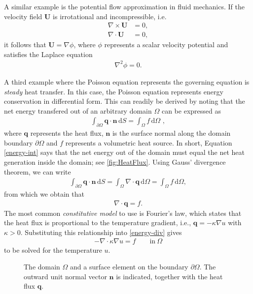 A similar example is the potential flow approximation in fluid mechanics. If the
velocity field $\bm U$ is irrotational and incompressible, i.e.
\begin{align}
  \nabla \times {\bm U} &= 0, \\
  \nabla \cdot  {\bm U} &= 0,
\end{align}
it follows that ${\bm U}= \nabla \phi$, where $\phi$ represents a scalar
velocity potential and satisfies the Laplace equation
\begin{align}
  \nabla^2 \phi = 0.
\end{align}

A third example where the Poisson equation represents the governing equation is
{\em steady} heat transfer. In this case, the Poisson equation represents energy
conservation in differential form. This can readily be derived by noting that
the net energy transfered out of an arbitrary domain $\Omega$ can be expressed
as
\begin{align}
  \label{energy-int}
  \int_{\partial\Omega} {\bm q}\cdot {\bm n}\, \mathrm{d}S =
  \int_{\Omega}f\, \mathrm{d}\Omega \,\, ,
\end{align}
where $\mathbf{q}$ represents the heat flux, $\mathbf{n}$ is the surface normal
along the domain boundary $\partial\Omega$ and $f$ represents a volumetric heat
source. In short, Equation \eqref{energy-int} says that the net energy out of
the domain must equal the net heat generation inside the domain; see
\autoref{fig:HeatFlux}. Using Gauss' divergence theorem, we can write
\begin{align}
  \int_{\partial\Omega} {\bm q}\cdot {\bm n}\, \mathrm{d}S =
  \int_{\Omega} \nabla \cdot {\bm q}\, \mathrm{d}\Omega = \int_{\Omega}f\,
  \mathrm{d}\Omega,
\end{align}
from which we obtain that
\begin{align}
  \label{energy-div}
  \nabla \cdot {\bm q} = f.
\end{align}
The most common {\em constitutive model} to use is Fourier's law, which states
that the heat flux is proportional to the temperature gradient, i.e., ${\bm q} =
- \kappa \nabla u$ with $\kappa > 0$. Substituting this relationship
into \eqref{energy-div} gives
\begin{align}
  - \nabla\cdot\kappa\nabla u = f \qquad \text{in} \  \Omega
\end{align}
to be solved for the temperature $u$.

\begin{figure}
  \centering
  
  \caption{
    The domain $\Omega$ and a surface element on the boundary
    $\partial\Omega$. The outward unit normal vector ${\bm n}$ is indicated,
    together with the heat flux ${\bm q}$.
  }
  \label{fig:HeatFlux}
\end{figure}

